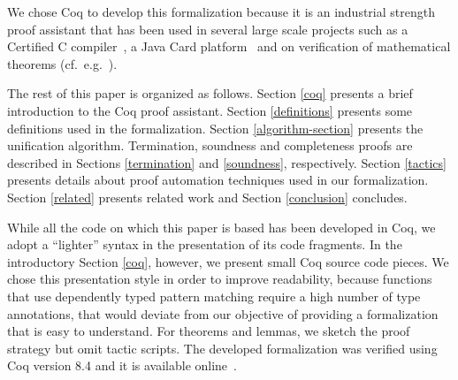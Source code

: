 We chose Coq to develop this formalization because it is an industrial
strength proof assistant that has been used in several large scale
projects such as a Certified C compiler~, a Java Card
platform~ and on verification of mathematical theorems
(cf.~e.g.~).

The rest of this paper is organized as follows. Section \ref{coq}
presents a brief introduction to the Coq proof assistant.  Section
\ref{definitions} presents some definitions used in the
formalization. Section \ref{algorithm-section} presents the
unification algorithm. Termination, soundness and completeness proofs
are described in Sections \ref{termination} and \ref{soundness},
respectively. Section \ref{tactics} presents details about proof
automation techniques used in our formalization.
Section \ref{related} presents related work and Section \ref{conclusion}
concludes.

While all the code on which this paper is based has been developed in
Coq, we adopt a ``lighter'' syntax in the presentation of its code
fragments. In the introductory Section \ref{coq}, however, we present
small Coq source code pieces. We chose this presentation style in
order to improve readability, because functions that use dependently
typed pattern matching require a high number of type annotations, that
would deviate from our objective of providing a formalization that is
easy to understand. 
For theorems and lemmas, we sketch the proof strategy
but omit tactic scripts. The developed formalization was verified
using Coq version 8.4 and it is available online~.
